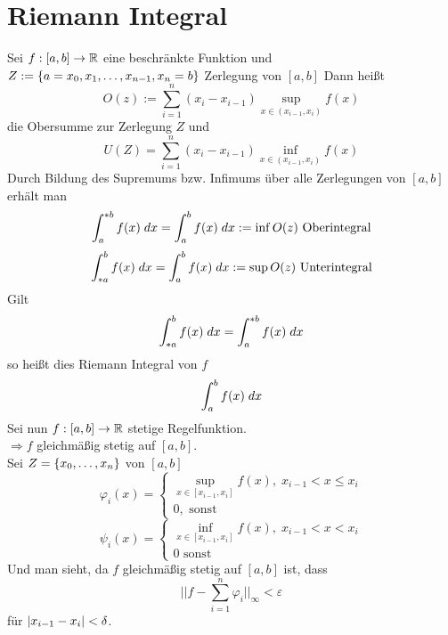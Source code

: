 \documentclass[../ana2u.tex]{subfiles}
\begin{document}
\setcounter{section}{3}
\section{Riemann Integral}
\begin{defi}
    Sei \( \abb{f}{[a,b]}{\R} \) eine beschränkte Funktion und 
    \( Z := \set{a=x_0, x_1, \dots, x_{n-1}, x_n = b} \)
    Zerlegung von \([a,b]\)    
    Dann heißt 
    \[ O(z) := \sum_{i=1}^n (x_i - x_{i-1}) 
    \underset{x\in(x_{i-1}, x_i)}{\sup} f(x) \]
    die Obersumme zur Zerlegung \(Z\) und 
    \[ U(Z) = \sum_{i=1}^n (x_i - x_{i-1}) 
    \underset{x\in(x_{i-1},x_i)}{\inf} f(x)  \]
    Durch Bildung des Supremums bzw. Infimums
    über alle Zerlegungen von \( [a,b] \) erhält man
    \[ \int_a^{*b} f(x) \dx 
    = \integral{f(x)}{a}{b} := \inf O(z) 
    \text{ Oberintegral} \]
    \[ \int_{*a}^b f(x) \dx 
    = \integral{f(x)}{a}{b} := \sup O(z) 
    \text{ Unterintegral} \]
    Gilt
    \[ \int_{*a}^b f(x) \dx = \int_a^{*b} f(x) \dx \]
    so heißt dies Riemann Integral von \(f\)
    \[ \integral{f(x)}{a}{b} \]
    Sei nun \( \abb{f}{[a,b]}{\R} \) stetige Regelfunktion. \\
    \( \Rightarrow f \) gleichmäßig stetig auf \([a,b]\).\\
    Sei \( Z=\set{x_0, \dots, x_n} \) von \([a,b]\)
    \[ \varphi_i(x) = \begin{cases}
        \underset{x\in[x_{i-1}, x_i]}{\sup} f(x), \; x_{i-1} < x \leq x_i \\
        0, \text{ sonst}
    \end{cases}\]
    \[ \psi_i (x) = \begin{cases}
        \underset{x \in [x_{i-1}, x_i]}{\inf} f(x), \; x_{i-1} < x < x_i\\
        0 \text{ sonst}
    \end{cases} \]
    Und man sieht, da \( f \) gleichmäßig stetig auf 
    \( [a,b] \) ist, dass 
    \[ ||f - \sum_{i=1}^n \varphi_i ||_\infty < \varepsilon \]
    für \( \abs{x_{i-1} - x_i} < \delta \).
\end{defi}
\end{document}
